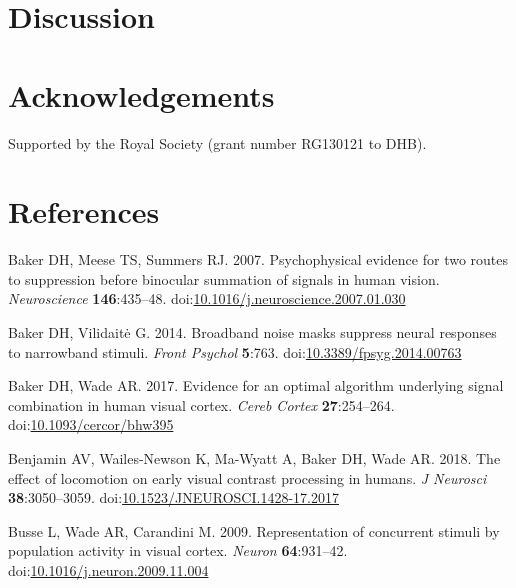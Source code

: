 \documentclass[]{article}
\begin{document}
\hypertarget{discussion}{%
\section{Discussion}\label{discussion}}

\hypertarget{acknowledgements}{%
\section{Acknowledgements}\label{acknowledgements}}

Supported by the Royal Society (grant number RG130121 to DHB).

\hypertarget{references}{%
\section*{References}\label{references}}

\hypertarget{refs}{}
\leavevmode\hypertarget{ref-Baker2007}{}%
Baker DH, Meese TS, Summers RJ. 2007. Psychophysical evidence for two routes to suppression before binocular summation of signals in human vision. \emph{Neuroscience} \textbf{146}:435--48. doi:\href{https://doi.org/10.1016/j.neuroscience.2007.01.030}{10.1016/j.neuroscience.2007.01.030}

\leavevmode\hypertarget{ref-Baker2014}{}%
Baker DH, Vilidaitė G. 2014. Broadband noise masks suppress neural responses to narrowband stimuli. \emph{Front Psychol} \textbf{5}:763. doi:\href{https://doi.org/10.3389/fpsyg.2014.00763}{10.3389/fpsyg.2014.00763}

\leavevmode\hypertarget{ref-Baker2017}{}%
Baker DH, Wade AR. 2017. Evidence for an optimal algorithm underlying signal combination in human visual cortex. \emph{Cereb Cortex} \textbf{27}:254--264. doi:\href{https://doi.org/10.1093/cercor/bhw395}{10.1093/cercor/bhw395}

\leavevmode\hypertarget{ref-Benjamin2018}{}%
Benjamin AV, Wailes-Newson K, Ma-Wyatt A, Baker DH, Wade AR. 2018. The effect of locomotion on early visual contrast processing in humans. \emph{J Neurosci} \textbf{38}:3050--3059. doi:\href{https://doi.org/10.1523/JNEUROSCI.1428-17.2017}{10.1523/JNEUROSCI.1428-17.2017}

\leavevmode\hypertarget{ref-Busse2009}{}%
Busse L, Wade AR, Carandini M. 2009. Representation of concurrent stimuli by population activity in visual cortex. \emph{Neuron} \textbf{64}:931--42. doi:\href{https://doi.org/10.1016/j.neuron.2009.11.004}{10.1016/j.neuron.2009.11.004}
\end{document}

